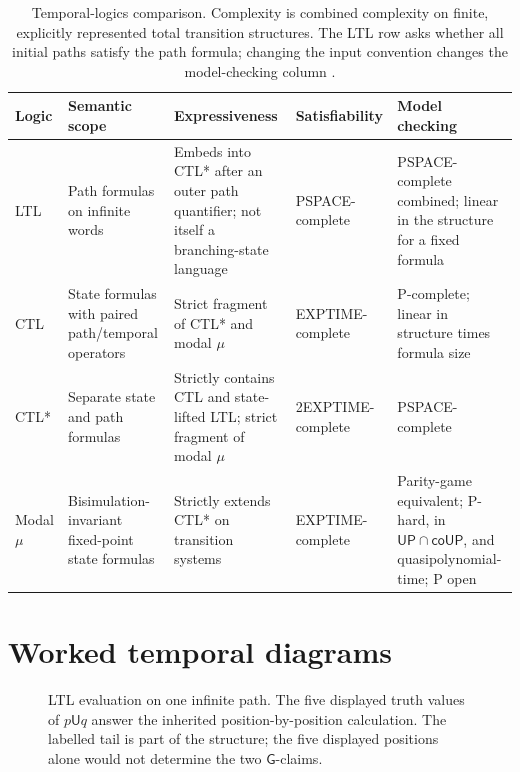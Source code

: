 \begin{table}[!htbp]
\centering
\scriptsize
\begin{tabular}{@{}p{}p{}p{}p{}p{}@{}}
\toprule
Logic & Semantic scope & Expressiveness & Satisfiability & Model checking \\
\midrule
LTL & Path formulas on infinite words & Embeds into CTL* after an outer path
quantifier; not itself a branching-state language & PSPACE-complete &
PSPACE-complete combined; linear in the structure for a fixed formula \\
CTL & State formulas with paired path/temporal operators & Strict fragment of
CTL* and modal \(\mu\) & EXPTIME-complete & P-complete; linear in structure
times formula size \\
CTL* & Separate state and path formulas & Strictly contains CTL and state-lifted
LTL; strict fragment of modal \(\mu\) & 2EXPTIME-complete & PSPACE-complete \\
Modal \(\mu\) & Bisimulation-invariant fixed-point state formulas & Strictly
extends CTL* on transition systems & EXPTIME-complete & Parity-game equivalent;
P-hard, in \(\mathsf{UP}\cap\mathsf{coUP}\), and quasipolynomial-time; P open \\
\bottomrule
\end{tabular}
\caption{Temporal-logics comparison.  Complexity is combined
complexity on finite, explicitly represented total transition structures.
The LTL row asks whether all initial paths satisfy the path formula; changing
the input convention changes the model-checking column
\cite{SistlaClarke1985,ClarkeEmersonSistla1986,EmersonLei1987,
EmersonJutla1999,CaludeJainKhoussainovLiStephan2017}.}
\label{tab:p08-temporal-comparison}
\end{table}

\section{Worked temporal diagrams}

\begin{figure}[!htbp]
\centering
{}
\caption{LTL evaluation on one infinite path.  The five
displayed truth values of \(p\mathbin{\mathsf U}q\) answer the inherited
position-by-position calculation.  The labelled tail is part of the structure;
the five displayed positions alone would not determine the two
\(\mathsf G\)-claims.}
\label{fig:p08-ltl-path}
\end{figure}

